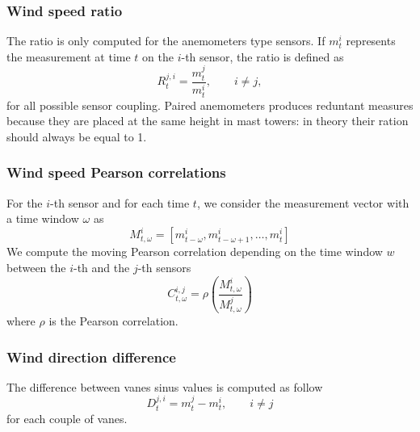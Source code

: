 \documentclass[conference]{IEEEtran}
\begin{document}
\subsubsection{Wind speed ratio}
The ratio is only computed for the anemometers type sensors. If $m_t^{i}$ represents the measurement at time $t$ on the $i$-th sensor, the ratio is defined as
\begin{equation}
R_{t}^{j,i} = \frac{m_{t}^{j}}{m_{t}^{i}},\qquad i \neq j,
\end{equation} 
for all possible sensor coupling. Paired anemometers produces reduntant measures because they are placed at the same  height in mast towers: in theory their ration should always be equal to 1.

\subsubsection{Wind speed  Pearson correlations}
For the $i$-th sensor and for each time $t$, we consider the measurement vector with a time window $\omega$ as 
\begin{equation}
M^i_{t,\omega} = [m_{t-\omega}^i,m_{t-\omega+1}^i,\ldots,m_t^i]
\end{equation}
We compute the moving Pearson correlation depending on the time window $w$ between the $i$-th and the $j$-th sensors
\begin{equation}
C^{i,j}_{t,\omega}= \rho\left( \frac{M^i_{t,\omega}}{M^j_{t,\omega}}\right)
\end{equation}
where $\rho$ is the Pearson correlation.
\subsubsection{Wind direction difference}
The difference between vanes sinus values is computed as follow
\begin{equation}
D_{t}^{j,i} = {m_{t}^{j} - m_{t}^{i}},\qquad i \neq j 
\end{equation} 
for each couple of vanes.
\end{document}
